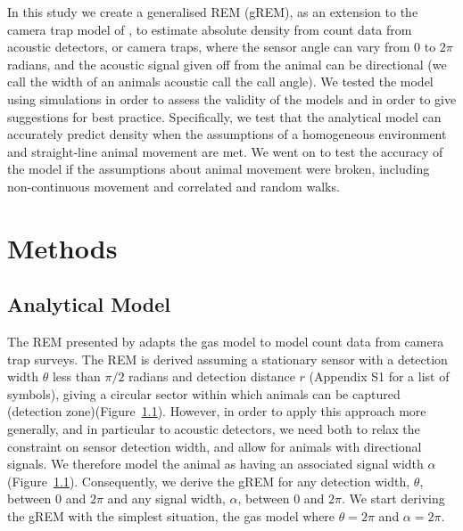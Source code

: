 \documentclass[a4paper,10pt,reqno,oneside]{amsart}
\begin{document}

In this study we create a generalised REM (gREM), as an extension to the camera trap model of \citep{rowcliffe2008estimating}, to estimate absolute density from count data from acoustic detectors, or camera traps, where the sensor angle can vary from 0 to $2\pi$ radians, and the acoustic signal given off from the animal can be directional (we call the width of an animals acoustic call the call angle).  We tested the model using simulations in order to assess the validity of the models and in order to give suggestions for best practice. Specifically, we test that the analytical model can accurately predict density when the assumptions of a homogeneous environment and straight-line animal movement are met. We went on to test the accuracy of the model if the assumptions about animal movement were broken, including non-continuous movement and correlated and random walks. 

\section{Methods}

\subsection{Analytical Model}

The REM presented by \citep{rowcliffe2008estimating} adapts the gas model to model count data from camera trap surveys. The REM is derived assuming a stationary sensor with a detection width $\theta$ less than $\pi/2$ radians and detection distance $r$ (Appendix S1 for a list of symbols), giving a circular sector within which animals can be captured (detection zone)(Figure~\ref{}). However, in order to apply this approach more generally, and in particular to acoustic detectors, we need both to relax the constraint on sensor detection width, and allow for animals with directional signals. We therefore model the animal as having an associated signal width $\alpha$ (Figure~\ref{}). Consequently, we derive the gREM for any detection width, $ \theta$, between 0 and $2\pi$ and any signal width, $ \alpha$, between 0 and $2\pi$. We start deriving the gREM with the simplest situation, the gas model where $\theta =  2\pi$ and $ \alpha =  2\pi$. 
\end{document}
